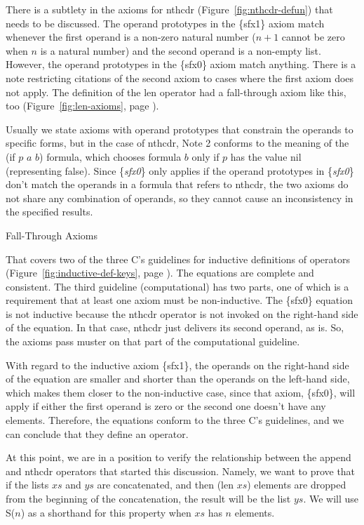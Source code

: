 \begin{aside}
There is a subtlety in the axioms for \textsf{nthcdr} (Figure~\ref{fig:nthcdr-defun})
that needs to be discussed.
The operand prototypes in the
\{sfx1\} axiom match whenever the first operand is a non-zero natural number
($n+1$ cannot be zero when $n$ is a natural number)
and the second operand is a non-empty list.
However, the operand prototypes in the \{sfx0\} axiom match anything.
There is a note restricting
citations of the second axiom to cases
where the first axiom does not apply.
The definition of the \textsf{len} operator
had a fall-through axiom like this, too
(Figure~\ref{fig:len-axioms}, page \pageref{fig:len-axioms}).

Usually we state axioms with operand prototypes that constrain
the operands to specific forms,
but in the case of \textsf{nthcdr}, Note 2 conforms to the meaning
of the \textsf{(if $p$ $a$ $b$)} formula, which chooses formula $b$
only if $p$ has the value \textsf{nil} (representing false).
Since \{\emph{sfx0}\} only applies if the operand prototypes in
\{\emph{sfx0}\} don't match the operands in a formula that refers to \textsf{nthcdr},
the two axioms do not share any combination of operands, so they cannot
cause an inconsistency in the specified results.
\caption{Fall-Through Axioms}
\label{fig:fall-through-axioms}
\end{aside}

That covers two of the three C's guidelines for inductive definitions of operators
(Figure~\ref{fig:inductive-def-keys}, page \pageref{fig:inductive-def-keys}).
The equations are complete and consistent.
The third guideline (computational) has two parts, one of which is
a requirement that at least one axiom must be non-inductive.
The \{sfx0\} equation is not inductive because the \textsf{nthcdr} operator
is not invoked on the right-hand side of the equation.
In that case, \textsf{nthcdr} just delivers its second operand, as is.
So, the axioms pass muster on that part of the computational guideline.

With regard to the inductive axiom \{sfx1\},
the operands on the right-hand side of the equation are
smaller and shorter than the operands on the left-hand side,
which makes them closer to the non-inductive case,
since that axiom, \{sfx0\}, will apply if either the first
operand is zero or the second one doesn't have any elements.
Therefore, the equations conform to the three C's guidelines,
and we can conclude that they define an operator.

At this point, we are in a position to verify the relationship
between the \textsf{append} and \textsf{nthcdr} operators that started this discussion.
Namely, we want to prove that if the lists $xs$ and $ys$ are concatenated,
and then \textsf{(len $xs$)} elements are dropped from the beginning of the
concatenation, the result will be the list $ys$.
We will use S($n$) as a shorthand for this property
when $xs$ has $n$ elements.

